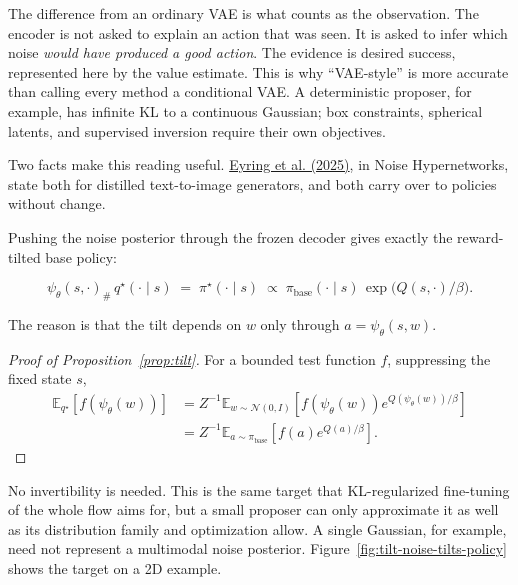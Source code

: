 The difference from an ordinary VAE is what counts as the observation. The encoder is not asked to explain an action that was seen. It is asked to infer which noise \emph{would have produced a good action}. The evidence is desired success, represented here by the value estimate. This is why ``VAE-style'' is more accurate than calling every method a conditional VAE. A deterministic proposer, for example, has infinite KL to a continuous Gaussian; box constraints, spherical latents, and supervised inversion require their own objectives.

Two facts make this reading useful. \hyperlink{ref:4}{Eyring et al. (2025)}, in Noise Hypernetworks, state both for distilled text-to-image generators, and both carry over to policies without change.

\begin{proposition}\label{prop:tilt}
Pushing the noise posterior through the frozen decoder gives exactly the reward-tilted base policy:

\begin{equation}
\psi_\theta(s, \cdot)_{\#}\, q^\star(\cdot \mid s) \;=\; \pi^\star(\cdot \mid s) \;\propto\; \pi_{\text{base}}(\cdot \mid s)\, \exp\big(Q(s, \cdot)/\beta\big).
\end{equation}
\end{proposition}
The reason is that the tilt depends on $w$ only through $a = \psi_\theta(s, w)$.

\begin{proof}[Proof of Proposition~\ref{prop:tilt}]
For a bounded test function $f$, suppressing the fixed state $s$,
\begin{equation*}
\begin{aligned}
\mathbb{E}_{q^\star}[f(\psi_\theta(w))]
&= Z^{-1}\mathbb{E}_{w\sim\mathcal{N}(0,I)}
   [f(\psi_\theta(w))e^{Q(\psi_\theta(w))/\beta}] \\
&= Z^{-1}\mathbb{E}_{a\sim\pi_{\text{base}}}
   [f(a)e^{Q(a)/\beta}].
\end{aligned}
\end{equation*}
\end{proof}

No invertibility is needed. This is the same target that KL-regularized fine-tuning of the whole flow aims for, but a small proposer can only approximate it as well as its distribution family and optimization allow. A single Gaussian, for example, need not represent a multimodal noise posterior. Figure~\ref{fig:tilt-noise-tilts-policy} shows the target on a 2D example.

